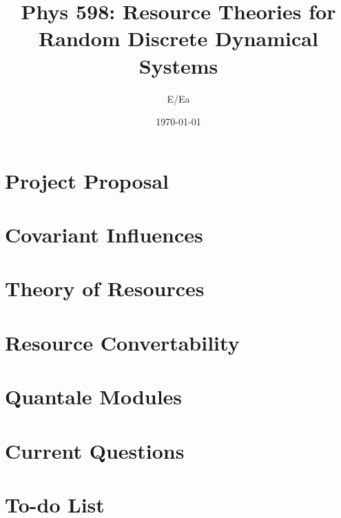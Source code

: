 \documentclass[12pt]{article}
\begin{document}


\title{Phys 598: Resource Theories for Random Discrete Dynamical Systems}
\author{E/Ea}
\date{\today}



\maketitle

\tableofcontents


\section{Project Proposal}




\section{Covariant Influences}





\section{Theory of Resources}






\section{Resource Convertability}






\section{Quantale Modules}





\section{Current Questions}




\section{To-do List}











\nocite{*}

\end{document}
